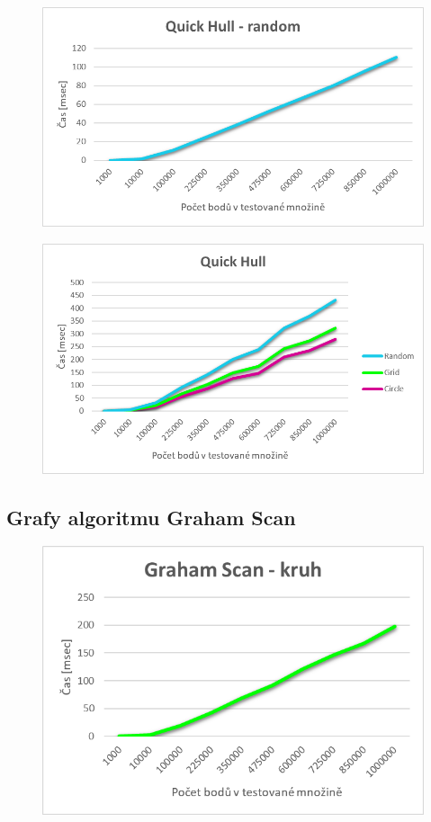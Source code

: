 \documentclass[a4paper, 12pt]{article}
\begin{document}
\clearpage
\begin{figure}[h!]
	\centering
	\includegraphics[width=15cm]{grafy/qh_random.png}
\end{figure}

\begin{figure}[h!]
	\centering
	\includegraphics[width=15cm]{grafy/qh.png}
\end{figure}

\clearpage
\subsection{Grafy algoritmu Graham Scan}
\begin{figure}[h!]
	\centering
	\includegraphics[width=15cm]{grafy/gs_circle.png}
\end{figure}
\end{document}
